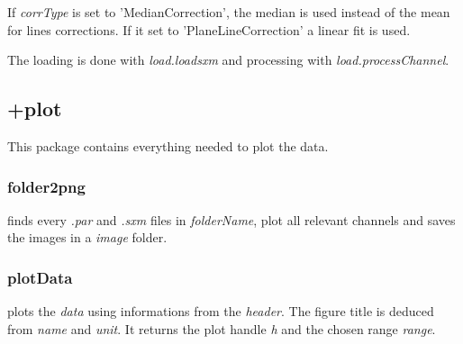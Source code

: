  If \emph{corrType} is set to 'MedianCorrection', the median is used instead of the mean for lines corrections. If it set to 'PlaneLineCorrection' a linear fit is used. 

\edf

The loading is done with \emph{load.loadsxm} and processing with \emph{load.processChannel}.

%
%
%
%

\subsection{+plot}
This package contains everything needed to plot the data.

\subsubsection{folder2png} 
\bdf
{} finds every \emph{.par} and \emph{.sxm} files in \emph{folderName}, plot all relevant channels and saves the images in a \emph{image} folder.
\edf
\subsubsection{plotData}
\label{sxm:plotData}
\bdf
{} plots the \emph{data} using informations from the \emph{header}. The figure title is deduced from \emph{name} and \emph{unit}. It returns the plot handle \emph{h} and the chosen range \emph{range}.


